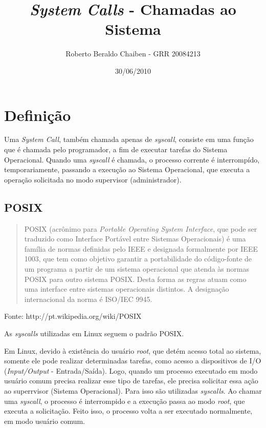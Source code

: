 \documentclass{article}
\title{\textit{System Calls} - Chamadas ao Sistema}
\author{Roberto Beraldo Chaiben - GRR 20084213}
\date{30/06/2010}
\begin{document}
\maketitle


\section{Definição}

Uma \textit{System Call}, também chamada apenas de \textit{syscall}, consiste em uma função que é chamada pelo programador, a fim
de executar tarefas do Sistema Operacional. Quando uma \textit{syscall} é chamada, o processo corrente é interrompído, temporariamente,
passando a execução ao Sistema Operacional, que executa a operação solicitada no modo supervisor (administrador).


\subsection{POSIX}


\begin{quotation}

POSIX (acrônimo para \textit{Portable Operating System Interface}, que pode ser traduzido como Interface Portável entre Sistemas Operacionais)
é uma família de normas definidas pelo IEEE e designada formalmente por IEEE 1003, que tem como objetivo garantir a portabilidade do código-fonte
de um programa a partir de um sistema operacional que atenda às normas POSIX para outro sistema POSIX. Desta forma as regras atuam como uma
interface entre sistemas operacionais distintos. A designação internacional da norma é ISO/IEC 9945.

\end{quotation}

\begin{flushright}
Fonte: http://pt.wikipedia.org/wiki/POSIX
\end{flushright}


As \textit{syscalls} utilizadas em Linux seguem o padrão POSIX.


Em Linux, devido à existência do usuário \textit{root}, que detém acesso total ao sistema, somente ele pode realizar determinadas tarefas,
como acesso a dispositivos de I/O (\textit{Input/Output} - Entrada/Saída). Logo, quando um processo executado em modo usuário comum precisa
realizar esse tipo de tarefas, ele precisa solicitar essa ação ao superrvisor (Sistema Operacional). Para isso são utilizadas \textit{syscalls}.
Ao chamar uma \textit{syscall}, o processo é interrompido e a execução passa ao modo \textit{root}, que executa a solicitação. Feito isso, o
processo volta a ser executado normalmente, em modo usuário comum.
\end{document}
